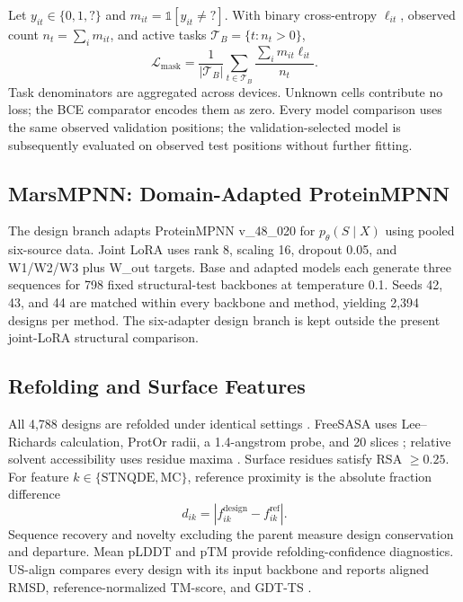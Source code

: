 \documentclass[conference]{IEEEtran}
\begin{document}
Let $y_{it}\in\{0,1,?\}$ and $m_{it}=\mathbb{1}[y_{it}\ne ?]$. With binary cross-entropy $\ell_{it}$, observed count $n_t=\sum_i m_{it}$, and active tasks $\mathcal{T}_B=\{t:n_t>0\}$,
\begin{equation}\mathcal{L}_{\mathrm{mask}}=\frac{1}{|\mathcal{T}_B|}\sum_{t\in\mathcal{T}_B}\frac{\sum_i m_{it}\ell_{it}}{n_t}.\end{equation}
Task denominators are aggregated across devices. Unknown cells contribute no loss; the BCE comparator encodes them as zero. Every model comparison uses the same observed validation positions; the validation-selected model is subsequently evaluated on observed test positions without further fitting.

\subsection{MarsMPNN: Domain-Adapted ProteinMPNN}
The design branch adapts ProteinMPNN v\_48\_020 for $p_\theta(S\mid X)$ using pooled six-source data. Joint LoRA uses rank 8, scaling 16, dropout 0.05, and W1/W2/W3 plus W\_out targets. Base and adapted models each generate three sequences for 798 fixed structural-test backbones at temperature 0.1. Seeds 42, 43, and 44 are matched within every backbone and method, yielding 2,394 designs per method. The six-adapter design branch is kept outside the present joint-LoRA structural comparison.

\subsection{Refolding and Surface Features}
All 4,788 designs are refolded under identical settings \cite{ref8}. FreeSASA uses Lee--Richards calculation, ProtOr radii, a 1.4-angstrom probe, and 20 slices \cite{ref9}; relative solvent accessibility uses residue maxima \cite{ref10}. Surface residues satisfy RSA $\geq0.25$. For feature $k\in\{\mathrm{STNQDE},\mathrm{MC}\}$, reference proximity is the absolute fraction difference
\begin{equation}d_{ik}=\left|f^{\mathrm{design}}_{ik}-f^{\mathrm{ref}}_{ik}\right|.\end{equation}
Sequence recovery and novelty excluding the parent measure design conservation and departure. Mean pLDDT and pTM provide refolding-confidence diagnostics. US-align compares every design with its input backbone and reports aligned RMSD, reference-normalized TM-score, and GDT-TS \cite{ref11}.
\end{document}
